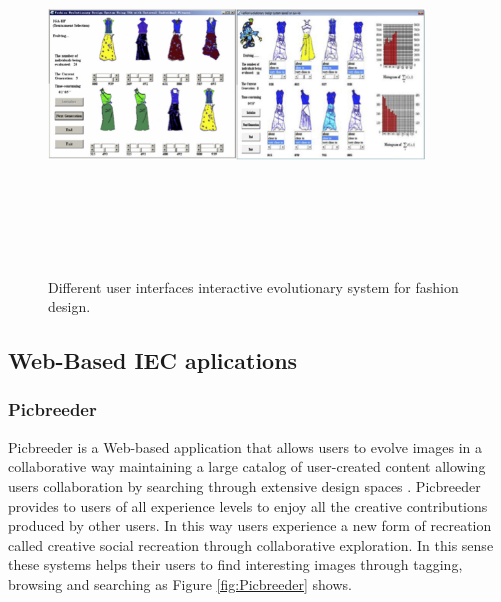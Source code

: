\begin{figure}
\captionsetup{justification=centering,margin=2cm}
\centering
\setlength\fboxsep{0pt}
\setlength\fboxrule{0.7pt}
\includegraphics[width=10cm,height=10cm,keepaspectratio]{img/fashion.png}
\caption{Different user interfaces interactive evolutionary system for fashion design.}
\label{fig:fashion}
\end{figure}

\subsection{Web-Based IEC aplications}


\subsubsection{Picbreeder}
Picbreeder is a Web-based application that allows users to evolve images in a
collaborative way maintaining a large catalog of user-created content allowing
users collaboration by searching through extensive design spaces
\cite{secretan2008picbreeder}. Picbreeder provides to users of all
experience levels to enjoy all the creative contributions produced by other
users. In this way users experience a new form of recreation called creative
social recreation through collaborative exploration. In this sense these systems
helps their users to find interesting images through tagging, browsing and
searching as Figure \ref{fig:Picbreeder} shows.

